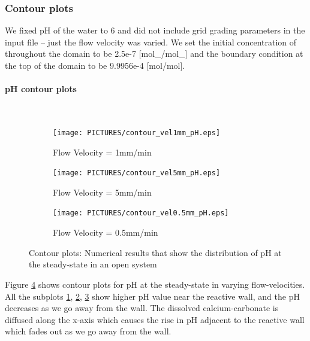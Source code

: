 \subsubsection*{Contour plots} \label{ssec:contour}
We fixed pH of the water to 6 and did not include grid grading parameters in the input file -- just the flow velocity was varied. We set the initial concentration of  throughout the domain to be 2.5e-7 [mol\_/mol\_] and the boundary condition at the top of the domain to be 9.9956e-4 [mol/mol].


\paragraph*{pH contour plots} \mbox{}\\
\begin{figure}[!h]
\centering
    \begin{subfigure}{.5\linewidth}
        \centering
        \texttt{[image: PICTURES/contour\_vel1mm\_pH.eps]}
        \caption{Flow Velocity = 1mm/min}
        \label{fig:pHSteady-state}       %
    \end{subfigure}%
    \hfill
    \begin{subfigure}{.5\linewidth}
        \centering
        \texttt{[image: PICTURES/contour\_vel5mm\_pH.eps]}
        \caption{Flow Velocity = 5mm/min}
        \label{fig:pHSteady-state5mm}       %
    \end{subfigure}%
    \hfill
    \begin{subfigure}{.5\linewidth}
        \centering
        \texttt{[image: PICTURES/contour\_vel0.5mm\_pH.eps]}
        \caption{Flow Velocity = 0.5mm/min}
        \label{fig:pHSteady-state0.5mm}       %
    \end{subfigure}%
    \caption{\DuMuX Contour plots: Numerical results that show the distribution of pH at the steady-state in an open system}
     \label{fig:contourpH}
\end{figure}

Figure \ref{fig:contourpH} shows contour plots for pH at the steady-state in varying flow-velocities. All the subplots \ref{fig:pHSteady-state}, \ref{fig:pHSteady-state5mm}, \ref{fig:pHSteady-state0.5mm} show higher pH value near the reactive wall, and the pH decreases as we go away from the wall. The dissolved calcium-carbonate is diffused along the x-axis which causes the rise in pH adjacent to the reactive wall which fades out as we go away from the wall.


